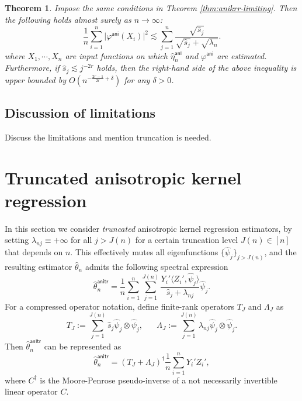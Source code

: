 \documentclass[11pt,a4paper]{article}
\renewcommand{\hat}{\widehat}
\theoremstyle{definition}
\theoremstyle{plain}
\newtheorem{theorem}{Theorem}[section]
\theoremstyle{remark}
\newcommand{\ani}{\mathsf{ani}}
\newcommand{\anitr}{\mathsf{anitr}}
\begin{document}
\begin{theorem}
Impose the same conditions in Theorem \ref{thm:anikrr-limiting}. Then the following holds almost surely as $n\to\infty$:
$$
\frac{1}{n}\sum_{i=1}^n \big|\varphi^\ani(X_i)\big|^2 \lesssim \sum_{j=1}^n \frac{\sqrt{\hat s_j}}{\sqrt{\hat s_j}+\sqrt{\lambda_n}}.
$$
where $X_1,\cdots,X_n$ are input functions on which $\hat\eta_n^\ani$ and $\varphi^\ani$ are estimated.
Furthermore, if $\hat s_j\lesssim j^{-2r}$ holds, then the right-hand side of the above inequality is upper bounded by $O(n^{-\frac{2r-1}{2r}+\delta})$
for any $\delta>0$.
\label{thm:anikrr-rates}
\end{theorem}

\subsection{Discussion of limitations}

{\color{red} Discuss the limitations and mention truncation is needed.}

\section{Truncated anisotropic kernel regression}\label{sec:anitr}

In this section we consider \emph{truncated} anisotropic kernel regression estimators, by setting $\lambda_{nj}\equiv +\infty$
for all $j> J(n)$ for a certain truncation level $J(n)\in[n]$ that depends on $n$.
This effectively mutes all eigenfunctions $\{\hat\psi_j\}_{j>J(n)}$, and the resulting estimator $\hat\theta_n$ admits the following spectral expression
\begin{equation}
\hat\theta_n^\anitr = \frac{1}{n}\sum_{i=1}^n\sum_{j=1}^{J(n)}\frac{Y_i'\langle Z_i',\hat\psi_j\rangle}{\hat s_j+\lambda_{nj}}\hat\psi_j.
\label{eq:anitr}
\end{equation}
For a compressed operator notation, define finite-rank operators $T_J$ and $\Lambda_J$ as
$$
T_J := \sum_{j=1}^{J(n)}\hat s_j\hat\psi_j\otimes\hat\psi_j,\;\;\;\;\;\; \Lambda_J := \sum_{j=1}^{J(n)}\lambda_{nj}\hat\psi_j\otimes\hat\psi_j.
$$
Then $\hat\theta_n^\anitr$ can be represented as
$$
\hat\theta_n^\anitr = (T_J+\Lambda_J)^{\dagger}\frac{1}{n}\sum_{i=1}^n Y_i'Z_i',
$$
where $C^\dagger$ is the Moore-Penrose pseudo-inverse of a not necessarily invertible linear operator $C$.
\end{document}
